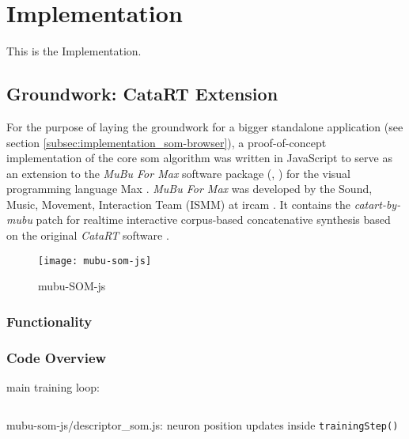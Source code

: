
\section{Implementation}
\label{sec:implementation}
This is the Implementation.

\subsection{Groundwork: CataRT Extension}
\label{subsec:implementation_catart}
For the purpose of laying the groundwork for a bigger standalone application
(see section \ref{subsec:implementation_som-browser}), a proof-of-concept
implementation of the core \gls{som} algorithm was written in JavaScript to
serve as an extension to the \textit{MuBu For Max} software package
(\citet{web:mubu2019}, \citet{web:mubu2019_2}) for the visual programming
language Max \citep{web:max2019}. \textit{MuBu For Max} was developed by the
Sound, Music, Movement, Interaction Team (ISMM) at \gls{ircam}
\citep{schnell2009}. It contains the \textit{catart-by-mubu} patch for
realtime interactive corpus-based concatenative synthesis based on the original
\textit{CataRT} software \citep{schwarz2006}.


\begin{figure}[!htb]
  \centering
  \texttt{[image: mubu-som-js]}
  \caption{mubu-SOM-js}
  \label{fig:mubu-som}
\end{figure}

\subsubsection{Functionality}
\label{subsubec:mubu-som_functionality}

\subsubsection{Code Overview}
\label{subsubsec:mubu-som_overview}

main training loop:

\begin{listing}[!htb]
  \begin{mdframed}
    \inputminted[breaklines, numbers=left, firstline=306, lastline=312,
    fontsize=\footnotesize]{js}{../dev/mubu-som-js/descriptor_som.js}
  \end{mdframed}
  \caption{mubu-som-js/descriptor\_som.js: neuron position updates inside
  \texttt{trainingStep()}}
\end{listing}

